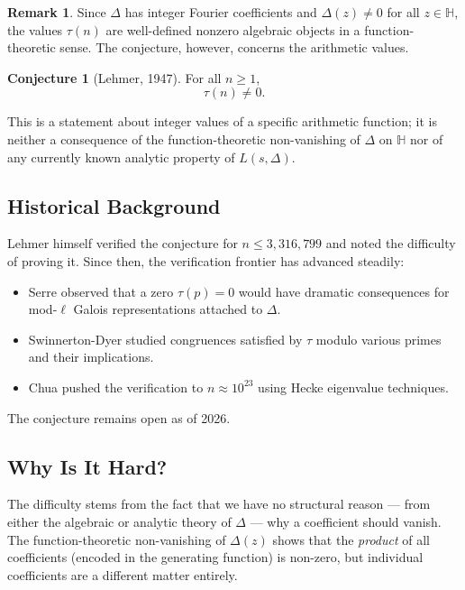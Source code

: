 \documentclass[12pt,a4paper]{amsart}
\theoremstyle{definition}
\newtheorem{remark}[theorem]{Remark}
\newtheorem{conjecture}[theorem]{Conjecture}
\begin{document}
\begin{remark}
  Since $\Delta$ has integer Fourier coefficients and $\Delta(z) \neq 0$ for all
  $z \in \mathbb{H}$, the values $\tau(n)$ are well-defined nonzero algebraic
  objects in a function-theoretic sense. The conjecture, however, concerns the
  arithmetic values.
\end{remark}

\begin{conjecture}[Lehmer, 1947]\label{conj:lehmer}
  For all $n \geq 1$,
  \[
    \tau(n) \neq 0.
  \]
\end{conjecture}

This is a statement about integer values of a specific arithmetic function; it
is neither a consequence of the function-theoretic non-vanishing of $\Delta$ on
$\mathbb{H}$ nor of any currently known analytic property of $L(s, \Delta)$.

\subsection{Historical Background}

Lehmer \cite{Lehmer1947} himself verified the conjecture for $n \leq 3{,}316{,}799$
and noted the difficulty of proving it. Since then, the verification frontier has
advanced steadily:
\begin{itemize}[leftmargin=2em]
  \item Serre \cite{Serre1987} observed that a zero $\tau(p) = 0$ would have
        dramatic consequences for mod-$\ell$ Galois representations attached to
        $\Delta$.
  \item Swinnerton-Dyer \cite{SwinnertonDyer1973} studied congruences satisfied
        by $\tau$ modulo various primes and their implications.
  \item Chua \cite{Chua2004} pushed the verification to $n \approx 10^{23}$ using
        Hecke eigenvalue techniques.
\end{itemize}

The conjecture remains open as of 2026.

\subsection{Why Is It Hard?}

The difficulty stems from the fact that we have no structural reason --- from
either the algebraic or analytic theory of $\Delta$ --- why a coefficient should
vanish. The function-theoretic non-vanishing of $\Delta(z)$ shows that the
\emph{product} of all coefficients (encoded in the generating function) is
non-zero, but individual coefficients are a different matter entirely.
\end{document}
